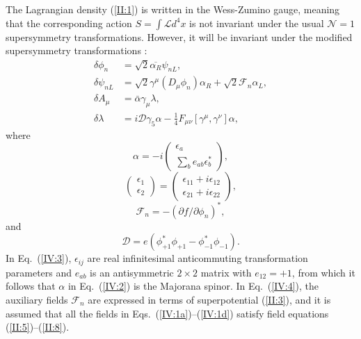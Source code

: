 The Lagrangian  density  (\ref{II:1})  is  written  in  the  Wess-Zumino gauge,
meaning  that  the  corresponding  action  $S  =  \int\mathcal{L}d^{4}x$ is not
invariant under the usual $\mathcal{N} = 1$ supersymmetry transformations.
However, it will be invariant under  the modified supersymmetry transformations
\cite{de_Witt_Freedman_1975}:
\begin{subequations}                                               \label{IV:1}
\begin{flalign}
\delta \phi _{n} &= \sqrt{2}\overline{\alpha _{R}}\psi _{nL},     \label{IV:1a}
 \\
\delta \psi _{nL} &= \sqrt{2}\gamma ^{\mu }\left( D_{\mu }\phi _{n}\right)
\alpha _{R}+\sqrt{2}\mathcal{F}_{n}\alpha _{L},                   \label{IV:1b}
 \\
\delta A_{\mu } &= \bar{\alpha }\gamma _{\mu }\lambda,            \label{IV:1c}
 \\
\delta \lambda  &= i \mathcal{D}\gamma_{5}\alpha - \frac{1}{4} F_{\mu \nu}
\left[\gamma^{\mu},\gamma^{\nu}\right] \alpha,                    \label{IV:1d}
\end{flalign}
\end{subequations}
where
\begin{equation}
\alpha =-i%
\begin{pmatrix}
\epsilon _{a} \\
\sum\nolimits_{b}e_{ab}\epsilon_{b}^{\ast}
\end{pmatrix},                                                     \label{IV:2}
\end{equation}
\begin{equation}
\begin{pmatrix}
\epsilon _{1} \\
\epsilon _{2}%
\end{pmatrix}%
=%
\begin{pmatrix}
\epsilon _{11}+i\epsilon _{12} \\
\epsilon _{21}+i\epsilon _{22}%
\end{pmatrix},                                                     \label{IV:3}
\end{equation}
\begin{equation}
\mathcal{F}_{n}=-\left(\partial f/\partial\phi_{n}\right)^{\ast},  \label{IV:4}
\end{equation}
and
\begin{equation}
\mathcal{D}=e\left(\phi_{+1}^{\ast}\phi_{+1}-\phi_{-1}^{\ast}\phi_{-1}\right).
                                                                   \label{IV:5}
\end{equation}
In Eq.~(\ref{IV:3}),  $\epsilon_{i j}$  are  real  infinitesimal  anticommuting
transformation parameters and $e_{a b}$  is an antisymmetric $2\times 2$ matrix
with $e_{1 2}= +1$, from which it follows that $\alpha$ in  Eq.~(\ref{IV:2}) is
the Majorana spinor.
In Eq.~(\ref{IV:4}), the  auxiliary  fields  $\mathcal{F}_{n}$ are expressed in
terms of superpotential  (\ref{II:3}), and  it  is  assumed that all the fields
in Eqs.~(\ref{IV:1a})--(\ref{IV:1d})       satisfy         field      equations
(\ref{II:5})--(\ref{II:8}).


